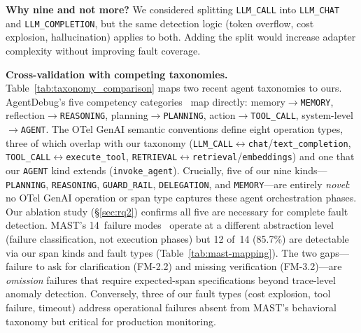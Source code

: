 \documentclass[sigplan,10pt,screen]{acmart}
\begin{document}
\textbf{Why nine and not more?}  We considered splitting
\texttt{LLM\_CALL} into \texttt{LLM\_CHAT} and
\texttt{LLM\_COMPLETION}, but the same detection logic
(token overflow, cost explosion, hallucination) applies to both.
Adding the split would increase adapter complexity without improving
fault coverage.

\textbf{Cross-validation with competing taxonomies.}
Table~\ref{tab:taxonomy_comparison} maps two recent agent
taxonomies to ours.  AgentDebug's five competency
categories~\cite{agentdebug} map directly: memory$\to$\texttt{MEMORY},
reflection$\to$\texttt{REASONING}, planning$\to$\texttt{PLANNING},
action$\to$\texttt{TOOL\_CALL}, system-level$\to$\texttt{AGENT}.
The OTel GenAI semantic conventions define eight operation
types, three of which overlap with our taxonomy
(\texttt{LLM\_CALL}$\leftrightarrow$\texttt{chat}/\texttt{text\_completion},
\texttt{TOOL\_CALL}$\leftrightarrow$\texttt{execute\_tool},
\texttt{RETRIEVAL}$\leftrightarrow$\texttt{retrieval}/\texttt{embeddings})
and one that our \texttt{AGENT} kind extends
(\texttt{invoke\_agent}).  Crucially, five of our nine
kinds---\texttt{PLANNING}, \texttt{REASONING}, \texttt{GUARD\_RAIL},
\texttt{DELEGATION}, and \texttt{MEMORY}---are entirely
\emph{novel}: no OTel GenAI operation or span type captures these
agent orchestration phases.  Our ablation study
(\S\ref{sec:rq2}) confirms all five are necessary for complete
fault detection.
MAST's 14~failure modes~\cite{mast} operate at a different abstraction
level (failure classification, not execution phases) but 12 of~14 (85.7\%) are
detectable via our span kinds and fault types
(Table~\ref{tab:mast-mapping}).  The two gaps---failure to ask for
clarification (FM-2.2) and missing verification (FM-3.2)---are
\emph{omission} failures that require expected-span specifications beyond
trace-level anomaly detection.  Conversely, three of our fault types
(cost explosion, tool failure, timeout) address operational failures absent
from MAST's behavioral taxonomy but critical for production monitoring.
\end{document}
